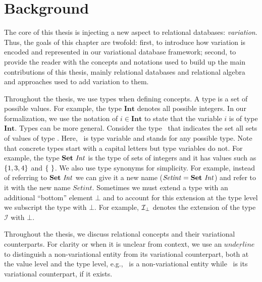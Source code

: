 \chapter{Background}
\label{ch:bg}


The core of this thesis is injecting a new aspect to relational databases: \emph{variation}.
Thus, the goals of this chapter are twofold: 
%
first, to introduce how variation is encoded and represented in our variational database framework;
%
second, to provide the reader with the concepts and notations
used to build up the main contributions of this thesis, mainly relational databases and
relational algebra
%
and approaches used to add variation to them.

%
Throughout the thesis, we use types when defining concepts. 
A type is a set of possible values. For example, the type $\mathbf{Int}$
denotes all possible integers. In our formalization, we use the notation of $i \in \mathbf{Int}$ to
state that the variable $i$ is of type $\mathbf{Int}$. 
%
Types can be more general. Consider the type \settype \typevar\ that indicates the set all sets
 of values of type \typevar. Here, \typevar\ is type variable and stands for any possible type. 
Note that concrete types start with a capital letters but type variables do not.
For example, the type $\settype {\mathit{Int}}$ is the type of
sets of integers and it has values such as $\setDef {1,3,4}$ and $\setDef {\ }$.
We also use type synonyms for simplicity. For example, instead of referring to
$\settype {\mathit{Int}}$ we can give it a new name ($\mathit{Setint}= \settype {\mathit{Int}}$) 
and refer to it with the new name $\mathit{Setint}$.
%
Sometimes we must extend a type with an additional ``bottom'' element $\bot$ and to account for this
extension at the type level we subscript the type with $\bot$. For example, $\maybe {\mathcal{I}}$
denotes the extension of the type $\mathcal{I}$ with $\bot$.
%

%
Throughout the thesis, we discuss relational concepts and their
variational counterparts. 
For clarity or when it is unclear from context, we use
an $\underline{underline}$ to distinguish a non-variational entity
from its variational counterpart, 
both at the value level and the type level,
e.g., \pElem\ is a 
non-variational entity while \elem\ is its variational counterpart,
if it exists.


